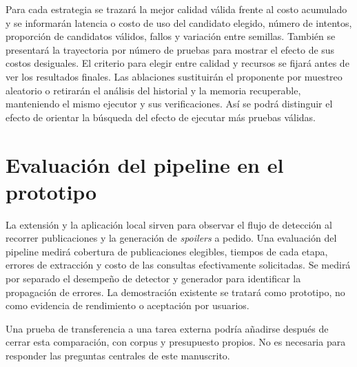 Para cada estrategia se trazará la mejor calidad válida frente al costo acumulado y se informarán latencia o costo de uso del candidato elegido, número de intentos, proporción de candidatos válidos, fallos y variación entre semillas. También se presentará la trayectoria por número de pruebas para mostrar el efecto de sus costos desiguales. El criterio para elegir entre calidad y recursos se fijará antes de ver los resultados finales. Las ablaciones sustituirán el proponente por muestreo aleatorio o retirarán el análisis del historial y la memoria recuperable, manteniendo el mismo ejecutor y sus verificaciones. Así se podrá distinguir el efecto de orientar la búsqueda del efecto de ejecutar más pruebas válidas.

\section{Evaluación del pipeline en el prototipo}

La extensión y la aplicación local sirven para observar el flujo de detección al recorrer publicaciones y la generación de \emph{spoilers} a pedido. Una evaluación del pipeline medirá cobertura de publicaciones elegibles, tiempos de cada etapa, errores de extracción y costo de las consultas efectivamente solicitadas. Se medirá por separado el desempeño de detector y generador para identificar la propagación de errores. La demostración existente se tratará como prototipo, no como evidencia de rendimiento o aceptación por usuarios.

Una prueba de transferencia a una tarea externa podría añadirse después de cerrar esta comparación, con corpus y presupuesto propios. No es necesaria para responder las preguntas centrales de este manuscrito.
